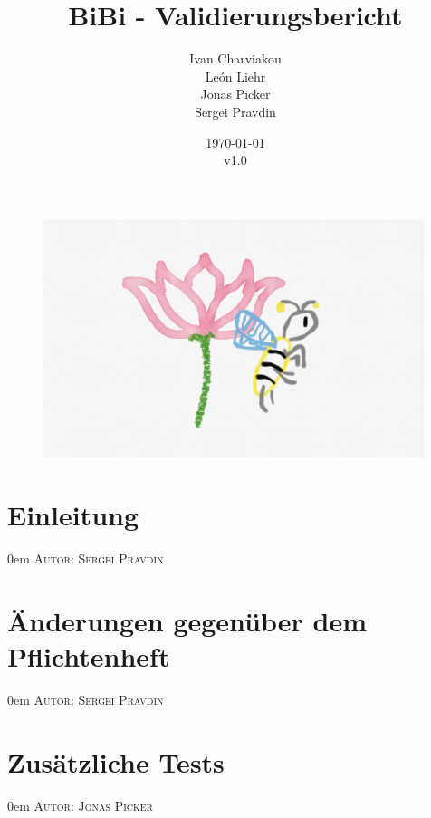 \documentclass{article}
\title{BiBi - Validierungsbericht}
\date{\today\\v1.0}
\author{
	Ivan Charviakou\\
	León Liehr\\
	Jonas Picker\\
	Sergei Pravdin
}
\makeatletter
\newcommand{\sectionauthor}[1]{
	{\parindent 0em \large \scshape Autor: #1 \par \nobreak \vspace*{1em}}
	\@afterheading
}
\makeatother
\begin{document}
\maketitle
\begin{figure}[H]
	\centering
	\includegraphics[width = 30em]{Logo}
\end{figure}
\newpage
\tableofcontents
\newpage

\section{Einleitung}
\sectionauthor{Sergei Pravdin}



\newpage

\section{Änderungen gegenüber dem Pflichtenheft}
\sectionauthor{Sergei Pravdin}



\newpage

\section{Zusätzliche Tests}
\sectionauthor{Jonas Picker}
\end{document}
